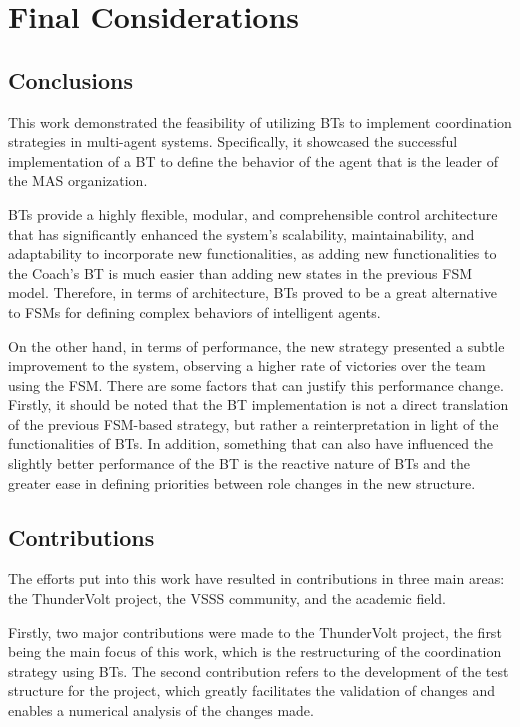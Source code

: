 \chapter{Final Considerations}
\label{ch:final_considerations}

\section{Conclusions}

This work demonstrated the feasibility of utilizing BTs to implement coordination strategies in multi-agent systems. Specifically, it showcased the successful implementation of a BT to define the behavior of the agent that is the leader of the MAS organization.

BTs provide a highly flexible, modular, and comprehensible control architecture that has significantly enhanced the system's scalability, maintainability, and adaptability to incorporate new functionalities, as adding new functionalities to the Coach's BT is much easier than adding new states in the previous FSM model. Therefore, in terms of architecture, BTs proved to be a great alternative to FSMs for defining complex behaviors of intelligent agents.

On the other hand, in terms of performance, the new strategy presented a subtle improvement to the system, observing a higher rate of victories over the team using the FSM. There are some factors that can justify this performance change. Firstly, it should be noted that the BT implementation is not a direct translation of the previous FSM-based strategy, but rather a reinterpretation in light of the functionalities of BTs. In addition, something that can also have influenced the slightly better performance of the BT is the reactive nature of BTs and the greater ease in defining priorities between role changes in the new structure.

\section{Contributions}

The efforts put into this work have resulted in contributions in three main areas: the ThunderVolt project, the VSSS community, and the academic field.

Firstly, two major contributions were made to the ThunderVolt project, the first being the main focus of this work, which is the restructuring of the coordination strategy using BTs. The second contribution refers to the development of the test structure for the project, which greatly facilitates the validation of changes and enables a numerical analysis of the changes made.

